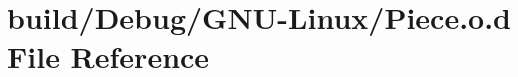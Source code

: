 \hypertarget{_g_n_u-_linux_2_piece_8o_8d}{}\section{build/\+Debug/\+G\+N\+U-\/\+Linux/\+Piece.o.\+d File Reference}
\label{_g_n_u-_linux_2_piece_8o_8d}
